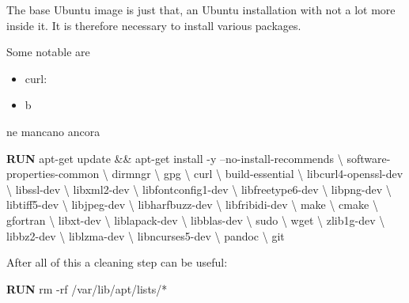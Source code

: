 \documentclass[]{article}
\newenvironment{Shaded}{\begin{snugshade}}{\end{snugshade}}
\newcommand{\KeywordTok}[1]{\textcolor[rgb]{0.13,0.29,0.53}{\textbf{#1}}}
\newcommand{\NormalTok}[1]{#1}
\providecommand{\tightlist}{%
  \setlength{\itemsep}{0pt}\setlength{\parskip}{0pt}}
\begin{document}
The base Ubuntu image is just that, an Ubuntu installation with not a
lot more inside it. It is therefore necessary to install various
packages.

Some notable are

\begin{itemize}
\tightlist
\item
  curl:
\item
  b
\end{itemize}

ne mancano ancora

\begin{Shaded}
\begin{Highlighting}[]
\KeywordTok{RUN}\NormalTok{ apt-get update && apt-get install -y --no-install-recommends \textbackslash{}}
\NormalTok{    software-properties-common \textbackslash{}}
\NormalTok{    dirmngr \textbackslash{}}
\NormalTok{    gpg \textbackslash{}}
\NormalTok{    curl \textbackslash{}}
\NormalTok{    build-essential \textbackslash{}}
\NormalTok{    libcurl4-openssl-dev \textbackslash{}}
\NormalTok{    libssl-dev \textbackslash{}}
\NormalTok{    libxml2-dev \textbackslash{}}
\NormalTok{    libfontconfig1-dev \textbackslash{}}
\NormalTok{    libfreetype6-dev \textbackslash{}}
\NormalTok{    libpng-dev \textbackslash{}}
\NormalTok{    libtiff5-dev \textbackslash{}}
\NormalTok{    libjpeg-dev \textbackslash{}}
\NormalTok{    libharfbuzz-dev \textbackslash{}}
\NormalTok{    libfribidi-dev \textbackslash{}}
\NormalTok{    make \textbackslash{}}
\NormalTok{    cmake \textbackslash{}}
\NormalTok{    gfortran \textbackslash{}}
\NormalTok{    libxt-dev \textbackslash{}}
\NormalTok{    liblapack-dev \textbackslash{}}
\NormalTok{    libblas-dev \textbackslash{}}
\NormalTok{    sudo \textbackslash{}}
\NormalTok{    wget \textbackslash{}}
\NormalTok{    zlib1g-dev \textbackslash{}}
\NormalTok{    libbz2-dev \textbackslash{}}
\NormalTok{    liblzma-dev \textbackslash{}}
\NormalTok{    libncurses5-dev \textbackslash{}}
\NormalTok{    pandoc \textbackslash{}}
\NormalTok{    git}
\end{Highlighting}
\end{Shaded}

After all of this a cleaning step can be useful:

\begin{Shaded}
\begin{Highlighting}[]
\KeywordTok{RUN}\NormalTok{ rm -rf /var/lib/apt/lists/*}
\end{Highlighting}
\end{Shaded}
\end{document}
